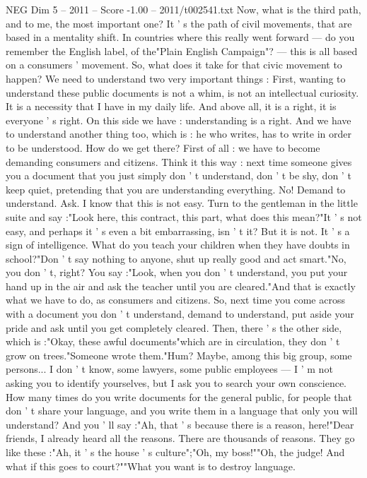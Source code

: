 \begin{textsample}{NEG Dim 5 – 2011 – Score -1.00 – 2011/t002541.txt}
Now, what is the third path, and to me, the most important one?
It ' s the path of civil movements, that are based in a mentality shift.
In countries where this really went forward — do you remember the English label, of the"Plain English Campaign"? — this is all based on a consumers ' movement.
So, what does it take for that civic movement to happen?
We need to understand two very important things : First, wanting to understand these public documents is not a whim, is not an intellectual curiosity.
It is a necessity that I have in my daily life.
And above all, it is a right, it is everyone ' s right.
On this side we have : understanding is a right.
And we have to understand another thing too, which is : he who writes, has to write in order to be understood.
How do we get there?
First of all : we have to become demanding consumers and citizens.
Think it this way : next time someone gives you a document that you just simply don ' t understand, don ' t be shy, don ' t keep quiet, pretending that you are understanding everything.
No!
Demand to understand.
Ask.
I know that this is not easy.
Turn to the gentleman in the little suite and say :"Look here, this contract, this part, what does this mean?"It ' s not easy, and perhaps it ' s even a bit embarrassing, isn ' t it?
But it is not.
It ' s a sign of intelligence.
What do you teach your children when they have doubts in school?"Don ' t say nothing to anyone, shut up really good and act smart."No, you don ' t, right?
You say :"Look, when you don ' t understand, you put your hand up in the air and ask the teacher until you are cleared."And that is exactly what we have to do, as consumers and citizens.
So, next time you come across with a document you don ' t understand, demand to understand, put aside your pride and ask until you get completely cleared.
Then, there ' s the other side, which is :"Okay, these awful documents"which are in circulation, they don ' t grow on trees."Someone wrote them."Hum?
Maybe, among this big group, some persons...
I don ' t know, some lawyers, some public employees — I ' m not asking you to identify yourselves, but I ask you to search your own conscience.
How many times do you write documents for the general public, for people that don ' t share your language, and you write them in a language that only you will understand?
And you ' ll say :"Ah, that ' s because there is a reason, here!"Dear friends, I already heard all the reasons.
There are thousands of reasons.
They go like these :"Ah, it ' s the house ' s culture";"Oh, my boss!""Oh, the judge!
And what if this goes to court?""What you want is to destroy language.

\end{textsample}
